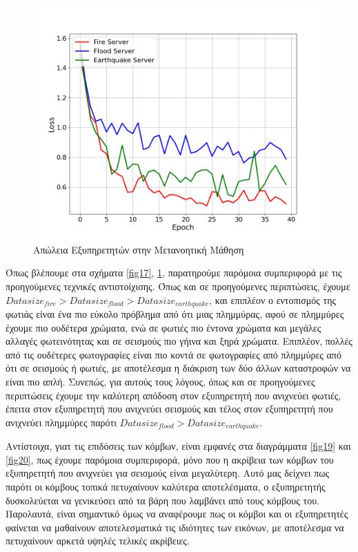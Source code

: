\begin{figure}[ht]
    \centering
    \includegraphics[width=\textwidth]{figures/chapter4/Server_Losses.png}
    \caption{Απώλεια Εξυπηρετητών στην Μετανοητική Μάθηση}
    \label{fig18}
\end{figure}

Όπως βλέπουμε στα σχήματα \ref{fig17}, \ref{fig18}, παρατηρούμε παρόμοια συμπεριφορά με τις προηγούμενες τεχνικές αντιστοίχισης. Όπως και σε προηγούμενες περιπτώσεις, έχουμε $Datasize_{fire} > Datasize_{flood} >Datasize_{earthquake}$, και επιπλέον ο εντοπισμός της φωτιάς είναι ένα πιο εύκολο πρόβλημα από ότι μιας πλημμύρας, αφού σε πλημμύρες έχουμε πιο ουδέτερα χρώματα, ενώ σε φωτιές πιο έντονα χρώματα και μεγάλες αλλαγές φωτεινότητας και σε σεισμούς πιο γήινα και ξηρά χρώματα. Επιπλέον, πολλές από τις ουδέτερες φωτογραφίες είναι πιο κοντά σε φωτογραφίες από πλημμύρες από ότι σε σεισμούς ή φωτιές, με αποτέλεσμα η διάκριση των δύο άλλων καταστροφών να είναι πιο απλή. Συνεπώς, για αυτούς τους λόγους, όπως και σε προηγούμενες περιπτώσεις έχουμε την καλύτερη απόδοση στον εξυπηρετητή που ανιχνεύει φωτιές, έπειτα στον εξυπηρετητή που ανιχνεύει σεισμούς και τέλος στον εξυπηρετητή που ανιχνεύει πλημμύρες παρότι $Datasize_{flood} >Datasize_{earthquake}$. 

Αντίστοιχα, γιατ τις επιδόσεις των κόμβων, είναι εμφανές στα διαγράμματα \ref*{fig19} και \ref*{fig20}, πως έχουμε παρόμοια συμπεριφορά, μόνο που η ακρίβεια των κόμβων του εξυπηρετητή που ανιχνεύει για σεισμούς είναι μεγαλύτερη. Αυτό μας δείχνει πως παρότι οι κόμβους τοπικά πετυχαίνουν καλύτερα αποτελέσματα, ο εξυπηρετητής δυσκολεύεται να γενικεύσει από τα βάρη που λαμβάνει από τους κόμβους του. Παρολαυτά, είναι σημαντικό όμως να αναφέρουμε πως οι κόμβοι και οι εξυπηρετητές φαίνεται να μαθαίνουν αποτελεσματικά τις ιδιότητες των εικόνων, με αποτέλεσμα να πετυχαίνουν αρκετά υψηλές τελικές ακρίβειες. 

